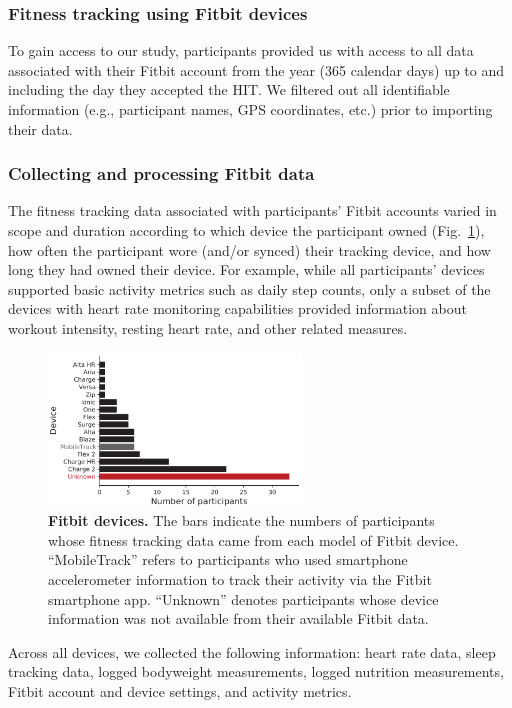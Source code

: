 \documentclass[10pt]{article}
\begin{document}
\subsubsection*{Fitness tracking using Fitbit devices}
To gain access to our study, participants provided us with access to
all data associated with their Fitbit account from the
year (365 calendar days) up to and including the day they accepted the
HIT.  We filtered out all identifiable information (e.g., participant names, GPS
coordinates, etc.) prior to importing their data.

\subsubsection*{Collecting and processing Fitbit data}

The fitness
tracking data associated with participants' Fitbit accounts varied in
scope and duration
according to which device the participant owned (Fig.~\ref{fig:devices}), how often the
participant wore (and/or synced) their tracking device, and how long they had owned their
device.  For example, while all participants' devices supported basic
activity metrics such as daily step counts, only a subset of the
devices with heart rate monitoring capabilities provided information
about workout intensity, resting heart rate, and other related
measures.

\begin{figure}[t]
\centering
\includegraphics[width=0.6\textwidth]{figs/devices}
\caption{\textbf{Fitbit devices.}  The bars indicate the numbers of
  participants whose fitness tracking data came from each model of
  Fitbit device.  ``MobileTrack'' refers to participants who used
  smartphone accelerometer information to track their activity via the
  Fitbit smartphone app.
  ``Unknown''  denotes participants whose device information was not
  available from their available Fitbit data.}
\label{fig:devices}
\end{figure}

Across all devices, we collected the following information: heart
rate data, sleep tracking data, logged bodyweight measurements, logged
nutrition measurements, Fitbit account and device settings, and
activity metrics.
\end{document}
